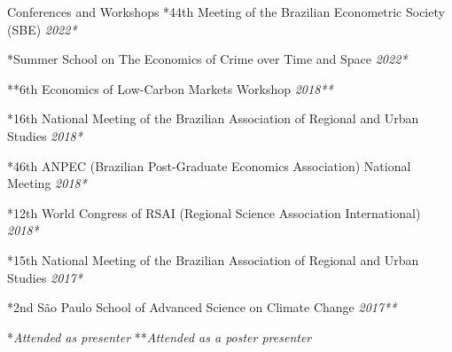 \documentclass{resume} %
\begin{document}
 
 \begin{rSection}{Conferences and Workshops}
{*44th Meeting of the Brazilian Econometric Society (SBE) } \hfill {\em 2022*}  

{*Summer School on The Economics of Crime over Time and Space} \hfill {\em 2022*}  

{**6th Economics of Low-Carbon Markets Workshop} \hfill {\em 2018**}  

{*16th National Meeting of the Brazilian Association of Regional and Urban Studies} \hfill {\em 2018*}  

{*46th ANPEC (Brazilian Post-Graduate Economics Association) National Meeting} \hfill {\em 2018*} 

{*12th World Congress of RSAI (Regional Science Association International) } \hfill {\em 2018*}  

{*15th National Meeting of the Brazilian Association of Regional and Urban Studies} \hfill {\em 2017*}  

{*2nd São Paulo School of Advanced Science on Climate Change} \hfill {\em 2017**} 

*\textit{Attended as presenter} **\textit{Attended as a poster presenter}

\end{rSection}

\pagebreak
\end{document}

